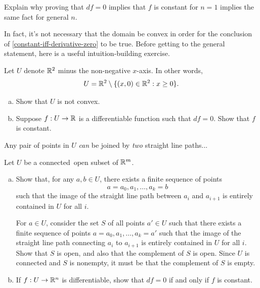 \begin{exercise} \label{constant-iff-derivative-zero-details}
	 Explain why proving that $df = 0$ implies that $f$ is constant for $n = 1$ implies the same fact for general $n$. 
\end{exercise}

In fact, it's not necessary that the domain be convex in order for the conclusion of \cref{constant-iff-derivative-zero} to be true. Before getting to the general statement, here is a useful intuition-building exercise. 

\begin{exercise}
	Let $U$ denote $\mathbb{R}^2$ minus the non-negative $x$-axis. In other words,
	\[ U = \mathbb{R}^2 \setminus \{ (x, 0) \in \mathbb{R}^2 : x \geq 0 \}. \]
	\begin{enumerate}[(a)]
		\item Show that $U$ is not convex. 
		\item Suppose $f : U \to \mathbb{R}$ is a differentiable function such that $df = 0$. Show that $f$ is constant.
	\end{enumerate} 
	\begin{hint}
		Any pair of points in $U$ \emph{can} be joined by \emph{two} straight line paths...
	\end{hint}
\end{exercise}

\begin{exercise} \label{constant-iff-derivative-zero-connected}
	Let $U$ be a connected\footnotemark\ open subset of $\mathbb{R}^m$.
	\begin{enumerate}[(a)]
		\item Show that, for any $a, b \in U$, there exists a finite sequence of points \[ a = a_0, a_1, \dotsc, a_k = b \] such that the image of the straight line path between $a_i$ and $a_{i+1}$ is entirely contained in $U$ for all $i$. 
		
		\begin{hint}
			For $a \in U$, consider the set $S$ of all points $a' \in U$ such that there exists a finite sequence of points $a = a_0, a_1, \dotsc, a_k = a'$ such that the image of the straight line path connecting $a_i$ to $a_{i+1}$ is entirely contained in $U$ for all $i$. Show that $S$ is open, and also that the complement of $S$ is open. Since $U$ is connected and $S$ is nonempty, it must be that the complement of $S$ is empty.  
		\end{hint}
		
		\item If $f : U \to \mathbb{R}^n$ is differentiable, show that $df = 0$ if and only if $f$ is constant. 
	\end{enumerate}
\end{exercise}

